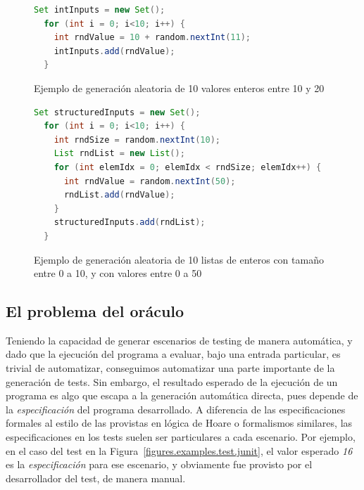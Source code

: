 \begin{figure}
	\small
	\begin{lstlisting}[frame=single, mathescape=true,language=Java,basicstyle={},xleftmargin=.04\textwidth,xrightmargin=.04\textwidth]
  Set intInputs = new Set();
  for (int i = 0; i<10; i++) {
    int rndValue = 10 + random.nextInt(11);
    intInputs.add(rndValue);
  }
	\end{lstlisting}
	\caption[Generaci\'on aleatoria de valores enteros]{Ejemplo de generaci\'on aleatoria de 10 valores enteros entre 10 y 20}
	\label{figures.examples.testing.random.primitive}
\end{figure}

\begin{figure}
	\small
	\begin{lstlisting}[frame=single, mathescape=true,language=Java,basicstyle={},xleftmargin=.04\textwidth,xrightmargin=.04\textwidth]
  Set structuredInputs = new Set();
  for (int i = 0; i<10; i++) {
    int rndSize = random.nextInt(10);
    List rndList = new List();
    for (int elemIdx = 0; elemIdx < rndSize; elemIdx++) {
      int rndValue = random.nextInt(50);
      rndList.add(rndValue);
    }
    structuredInputs.add(rndList);
  }
	\end{lstlisting}
	\caption[Generaci\'on aleatoria de listas]{Ejemplo de generaci\'on aleatoria de 10 listas de enteros con tama\~no entre 0 a 10, y con valores entre 0 a 50}
	\label{figures.examples.testing.random.structure}
\end{figure}


\subsection{El problema del or\'aculo}

Teniendo la capacidad de generar escenarios de testing de manera autom\'atica, y dado que la ejecuci\'on del programa a evaluar, bajo una entrada particular, es trivial de automatizar, conseguimos automatizar una parte importante de la generaci\'on de tests. Sin embargo, el resultado esperado de la ejecuci\'on de un programa es algo que escapa a la generaci\'on autom\'atica directa, pues depende de la \emph{especificaci\'on} del programa desarrollado. A diferencia de las especificaciones formales al estilo de las provistas en l\'ogica de Hoare o formalismos similares, las especificaciones en los tests suelen ser particulares a cada escenario. Por ejemplo, en el caso del test en la Figura~\ref{figures.examples.test.junit}, el valor esperado \emph{16} es la \emph{especificaci\'on} para ese escenario, y obviamente fue provisto por el desarrollador del test, de manera manual. 

